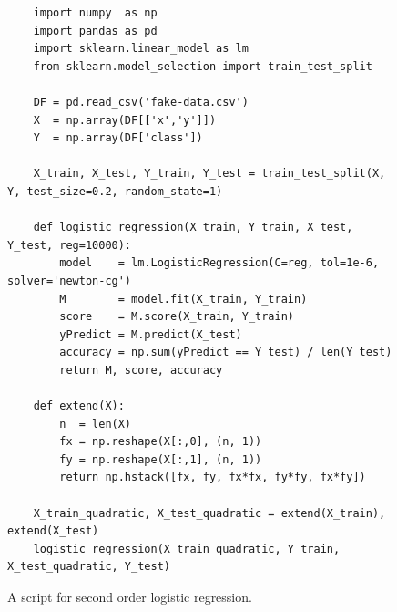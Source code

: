 \begin{figure}[!ht]
\centering

\begin{verbatim}
    import numpy  as np
    import pandas as pd
    import sklearn.linear_model as lm
    from sklearn.model_selection import train_test_split
  
    DF = pd.read_csv('fake-data.csv')
    X  = np.array(DF[['x','y']])
    Y  = np.array(DF['class'])
  
    X_train, X_test, Y_train, Y_test = train_test_split(X, Y, test_size=0.2, random_state=1)
  
    def logistic_regression(X_train, Y_train, X_test, Y_test, reg=10000):
        model    = lm.LogisticRegression(C=reg, tol=1e-6, solver='newton-cg')
        M        = model.fit(X_train, Y_train)
        score    = M.score(X_train, Y_train)
        yPredict = M.predict(X_test)
        accuracy = np.sum(yPredict == Y_test) / len(Y_test)
        return M, score, accuracy
  
    def extend(X):
        n  = len(X)
        fx = np.reshape(X[:,0], (n, 1))
        fy = np.reshape(X[:,1], (n, 1))
        return np.hstack([fx, fy, fx*fx, fy*fy, fx*fy])
  
    X_train_quadratic, X_test_quadratic = extend(X_train), extend(X_test)
    logistic_regression(X_train_quadratic, Y_train, X_test_quadratic, Y_test)
\end{verbatim}

\caption{A script for second order logistic regression.}
\label{fig:Polynomial-Logistic-Regression.ipynb-quadratic}
\end{figure}

